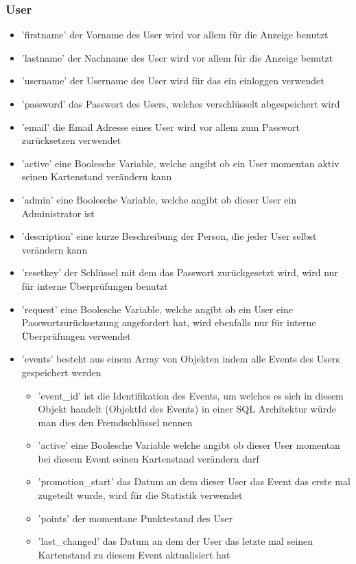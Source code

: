 \subsubsection{User}
\begin{itemize}
	\item 'firstname' der Vorname des User wird vor allem für die Anzeige benutzt
	\item 'lastname' der Nachname des User wird vor allem für die Anzeige benutzt
	\item 'username' der Username des User wird für das ein einloggen verwendet
	\item 'password' das Passwort des Users, welches verschlüsselt abgespeichert wird
	\item 'email' die Email Adresse eines User wird vor allem zum Passwort zurücksetzen verwendet
	\item 'active' eine Boolesche Variable, welche angibt ob ein User momentan aktiv seinen Kartenstand verändern kann
	\item 'admin' eine Boolesche Variable, welche angibt ob dieser User ein Administrator ist
	\item 'description' eine kurze Beschreibung der Person, die jeder User selbst verändern kann
	\item 'resetkey' der Schlüssel mit dem das Passwort zurückgesetzt wird, wird nur für interne Überprüfungen benutzt
	\item 'request' eine Boolesche Variable, welche angibt ob ein User eine Passwortzurücksetzung angefordert hat, wird ebenfalls nur für interne Überprüfungen verwendet
	\item 'events' besteht aus einem Array von Objekten indem alle Events des Users gespeichert werden
	\begin{itemize}
		\item 'event\_id' ist die Identifikation des Events, um welches es sich in diesem Objekt handelt (ObjektId des Events) in einer SQL Architektur würde man dies den Fremdschlüssel nennen
		\item 'active' eine Boolesche Variable welche angibt ob dieser User momentan bei diesem Event seinen Kartenstand verändern darf
		\item 'promotion\_start' das Datum an dem dieser User das Event das erste mal zugeteilt wurde, wird für die Statistik verwendet
		\item 'points' der momentane Punktestand des User
		\item 'last\_changed' das Datum an dem der User das letzte mal seinen Kartenstand zu diesem Event aktualisiert hat

\end{itemize}
\end{itemize}
